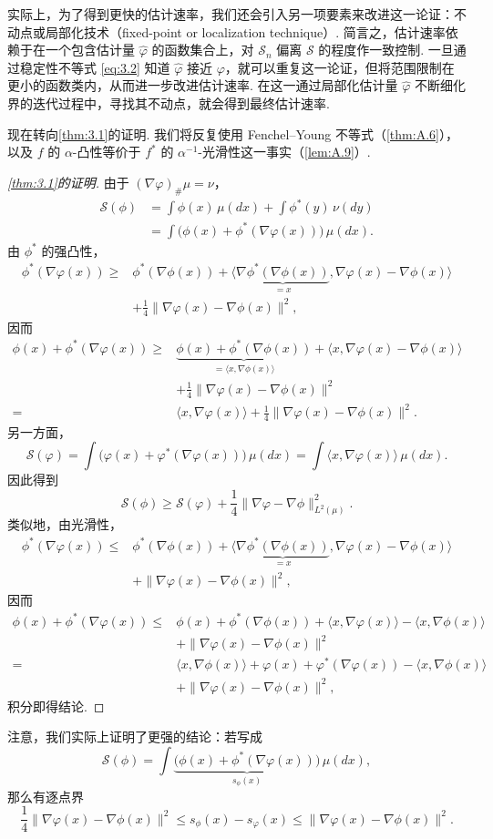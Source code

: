 实际上，为了得到更快的估计速率，我们还会引入另一项要素来改进这一论证：不动点或局部化技术（fixed-point or localization technique）. 简言之，估计速率依赖于在一个包含估计量 $\widehat\varphi$ 的函数集合上，对 $\mathcal S_n$ 偏离 $\mathcal S$ 的程度作一致控制. 一旦通过稳定性不等式 \eqref{eq:3.2} 知道 $\widehat\varphi$ 接近 $\varphi$，就可以重复这一论证，但将范围限制在更小的函数类内，从而进一步改进估计速率. 在这一通过局部化估计量 $\widehat\varphi$ 不断细化界的迭代过程中，寻找其不动点，就会得到最终估计速率.

现在转向\autoref{thm:3.1}的证明. 我们将反复使用 Fenchel--Young 不等式（\autoref{thm:A.6}），以及 $f$ 的 $\alpha$-凸性等价于 $f^*$ 的 $\alpha^{-1}$-光滑性这一事实（\autoref{lem:A.9}）.

\begin{proof}[\autoref{thm:3.1}的证明]
由于 $(\nabla\varphi)_\#\mu=\nu$，
$$
\begin{aligned}
\mathcal S(\phi)&=\int\phi(x)\,\mu(dx)+\int\phi^*(y)\,\nu(dy)\\
&=\int\bigl(\phi(x)+\phi^*(\nabla\varphi(x))\bigr)\,\mu(dx).
\end{aligned}
$$
由 $\phi^*$ 的强凸性，
$$
\begin{aligned}
\phi^*(\nabla\varphi(x))\ge{}&\phi^*(\nabla\phi(x))
+\langle\underbrace{\nabla\phi^*(\nabla\phi(x))}_{=x},\nabla\varphi(x)-\nabla\phi(x)\rangle\\
&+\frac14\|\nabla\varphi(x)-\nabla\phi(x)\|^2,
\end{aligned}
$$
因而
$$
\begin{aligned}
\phi(x)+\phi^*(\nabla\varphi(x))\ge{}&
\underbrace{\phi(x)+\phi^*(\nabla\phi(x))}_{=\langle x,\nabla\phi(x)\rangle}
+\langle x,\nabla\varphi(x)-\nabla\phi(x)\rangle\\
&+\frac14\|\nabla\varphi(x)-\nabla\phi(x)\|^2\\
={}&\langle x,\nabla\varphi(x)\rangle+\frac14\|\nabla\varphi(x)-\nabla\phi(x)\|^2.
\end{aligned}
$$
另一方面，
$$
\mathcal S(\varphi)=\int\bigl(\varphi(x)+\varphi^*(\nabla\varphi(x))\bigr)\,\mu(dx)
=\int\langle x,\nabla\varphi(x)\rangle\,\mu(dx).
$$
因此得到
$$\mathcal S(\phi)\ge\mathcal S(\varphi)+\frac14\|\nabla\varphi-\nabla\phi\|_{L^2(\mu)}^2.$$
类似地，由光滑性，
$$
\begin{aligned}
\phi^*(\nabla\varphi(x))\le{}&\phi^*(\nabla\phi(x))
+\langle\underbrace{\nabla\phi^*(\nabla\phi(x))}_{=x},\nabla\varphi(x)-\nabla\phi(x)\rangle\\
&+\|\nabla\varphi(x)-\nabla\phi(x)\|^2,
\end{aligned}
$$
因而
$$
\begin{aligned}
\phi(x)+\phi^*(\nabla\varphi(x))\le{}&\phi(x)+\phi^*(\nabla\phi(x))
+\langle x,\nabla\varphi(x)\rangle-\langle x,\nabla\phi(x)\rangle\\
&+\|\nabla\varphi(x)-\nabla\phi(x)\|^2\\
={}&\langle x,\nabla\phi(x)\rangle+\varphi(x)+\varphi^*(\nabla\varphi(x))
-\langle x,\nabla\phi(x)\rangle\\
&+\|\nabla\varphi(x)-\nabla\phi(x)\|^2,
\end{aligned}
$$
积分即得结论.
\end{proof}

注意，我们实际上证明了更强的结论：若写成
$$\mathcal S(\phi)=\int\underbrace{\bigl(\phi(x)+\phi^*(\nabla\varphi(x))\bigr)}_{s_\phi(x)}\,\mu(dx),$$
那么有逐点界
$$\frac14\|\nabla\varphi(x)-\nabla\phi(x)\|^2
\le s_\phi(x)-s_\varphi(x)\le\|\nabla\varphi(x)-\nabla\phi(x)\|^2.$$
